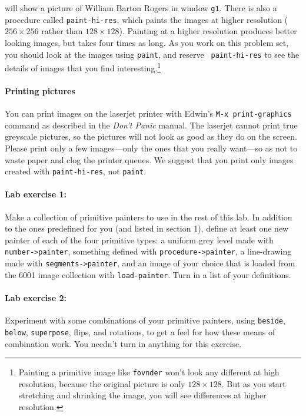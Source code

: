 \noindent
will show a picture of William Barton Rogers in window {\tt g1}.
There is also a procedure called {\tt paint-hi-res}, which paints the
images at higher resolution ($256 \times 256$ rather than $128 \times
128$).  Painting at a higher resolution produces better looking
images, but takes four times as long.  As you work on this problem
set, you should look at the images using {\tt paint}, and reserve {\tt
paint-hi-res} to see the details of images that you find
interesting.\footnote{Painting a primitive image like {\tt fovnder} won't
look any different at high resolution, because the original picture is
only $128 \times 128$.  But as you start stretching and shrinking the
image, you will see differences at higher resolution.}

\paragraph{Printing pictures} You can print images on the laserjet
printer with Edwin's {\tt M-x print-graphics} command as described
in the {\em Don't Panic} manual.  The laserjet cannot print true
greyscale pictures, so the pictures will not look as good as they do
on the screen. Please print only a few images---only the ones that you
really want---so as not to waste paper and clog the printer queues.
We suggest that you print only images created with {\tt paint-hi-res},
not {\tt paint}.

\paragraph{Lab exercise 1:}
Make a collection of primitive painters to use in the rest of this
lab.  In addition to the ones predefined for you (and listed in
section 1), define at least one new painter of each of the four
primitive types: a uniform grey level made with {\tt number->painter},
something defined with {\tt procedure->painter}, a line-drawing made
with {\tt segments->painter}, and an image of your choice that is
loaded from the 6001 image collection with {\tt load-painter}.  Turn
in a list of your definitions.

\paragraph{Lab exercise 2:}
Experiment with some combinations of your primitive painters, using
{\tt beside}, {\tt below}, {\tt superpose}, flips, and rotations, to get a
feel for how these means of combination work.  You needn't turn in
anything for this exercise.

